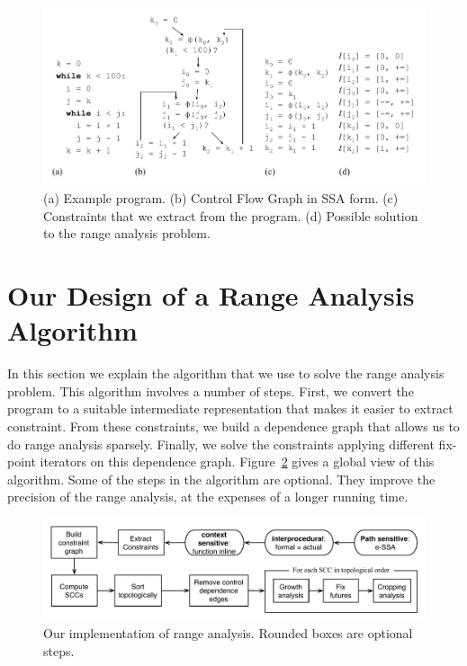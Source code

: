 \documentclass{llncs}
\begin{document}
\begin{figure}[t!]
\begin{center}
\includegraphics[width=1\textwidth]{images/ex1}
\end{center}
\caption{\label{fig:ex1}
(a) Example program.
(b) Control Flow Graph in SSA form.
(c) Constraints that we extract from the program.
(d) Possible solution to the range analysis problem.}
\end{figure}

\section{Our Design of a Range Analysis Algorithm}
\label{sec:algo}


In this section we explain the algorithm that we use to solve the range
analysis problem.
This algorithm involves a number of steps.
First, we convert the program to a suitable intermediate representation that
makes it easier to extract constraint.
From these constraints, we build a dependence graph that allows us to do
range analysis sparsely.
Finally, we solve the constraints applying different fix-point iterators on
this dependence graph.
Figure~\ref{fig:algorithm} gives a global view of this algorithm.
Some of the steps in the algorithm are optional.
They improve the precision of the range analysis, at the expenses of a longer
running time.

\begin{figure}[t!]
\begin{center}
\includegraphics[width=1\textwidth]{images/algorithm}
\end{center}
\caption{\label{fig:algorithm}
Our implementation of range analysis.
Rounded boxes are optional steps.}
\end{figure}
\end{document}

